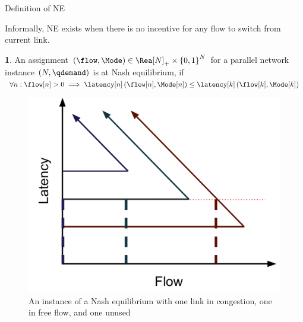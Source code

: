 \documentclass[xcolor=svgnames, english, smaller]{beamer}
\theoremstyle{plain}
\theoremstyle{definition}
\newtheorem{defn}[thm]{\protect\definitionname}
\theoremstyle{plain}
\theoremstyle{plain}
\providecommand{\definitionname}{Definition}
\begin{document}
\begin{frame}{Definition of NE}

	Informally, NE exists when there is no incentive for any flow to switch
from current link.
\begin{defn}
An assignment $\left(\flow,\Mode\right)\in\Rea[\NLinks]_{+}\times\left\{ 0,1\right\} ^{\NLinks}$
for a parallel network instance $\left(\NLinks,\qdemand\right)$ is
at Nash equilibrium, if $\forall\link:\flow[\link]>0\implies\latency[\link]\left(\flow[\link],\Mode[\link]\right)\le\latency[k]\left(\flow[k],\Mode[k]\right)$
\end{defn}
\begin{figure}
\begin{centering}
\includegraphics[scale=0.25]{../../figures/presentation/NE3link}
\par\end{centering}

\caption{An instance of a Nash equilibrium with one link in congestion, one
in free flow, and one unused}
\end{figure}



\end{frame}
\end{document}
